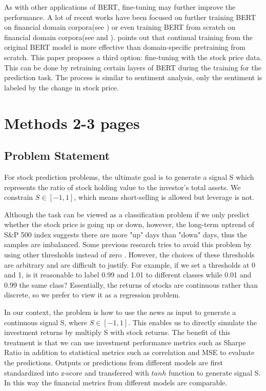 \documentclass[11pt]{article}
\begin{document}
As with other applications of BERT, fine-tuning may further improve the performance. A lot of recent works have been focused on further training BERT on financial domain corpora(see \citet{araci2019finbert}) or even training BERT from scratch on financial domain corpora(see \citet{yang2020finbert} and \citet{ijcai2020p622}). \citet{peng-etal-2021-domain} points out that continual training from the original BERT model is more effective than domain-specific pretraining from scratch. This paper proposes a third option: fine-tuning with the stock price data. This can be done by retraining certain layers of BERT during the training for the prediction task. The process is similar to sentiment analysis, only the sentiment is labeled by the change in stock price.


\section{Methods 2-3 pages}

\subsection{Problem Statement}

For stock prediction problems, the ultimate goal is to generate a signal S which represents the ratio of stock holding value to the investor's total assets. We constrain $S \in [-1,1]$, which means short-selling is allowed but leverage is not.

Although the task can be viewed as a classification problem if we only predict whether the stock price is going up or down, however, the long-term uptrend of S\&P 500 index suggests there are more "up" days than "down" days, thus the samples are imbalanced. Some previous research tries to avoid this problem by using other thresholds instead of zero \citep{xu-cohen-2018-stock}. However, the choices of these thresholds are arbitrary and are difficult to justify. For example, if we set a thresholds at 0 and 1, is it reasonable to label 0.99 and 1.01 to different classes while 0.01 and 0.99 the same class? Essentially, the returns of stocks are continuous rather than discrete, so we prefer to view it as a regression problem.

In our context, the problem is how to use the news as input to generate a continuous signal S, where $S \in [-1,1]$. This enables us to directly simulate the investment returns by multiply S with stock returns. The benefit of this treatment is that we can use investment performance metrics such as Sharpe Ratio in addition to statistical metrics such as correlation and MSE to evaluate the predictions. Outputs or predictions from different models are first standardized into z-score and transferred with $tanh$ function to generate signal S. In this way the financial metrics from different models are comparable.
\end{document}
